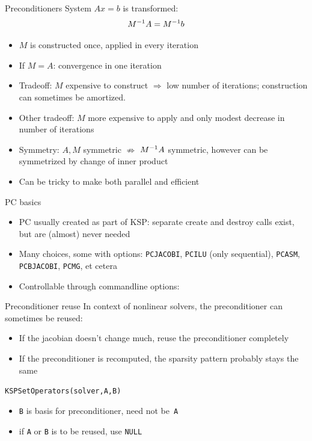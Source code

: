 \begin{longstory}
\begin{numberedframe}{Preconditioners}
System $Ax=b$ is transformed:
\[ M^{-1} A=M^{-1} b \]
\begin{itemize}
\item $M$ is constructed once, applied in every iteration
\item If $M=A$: convergence in one iteration
\item Tradeoff: $M$ expensive to construct $\Rightarrow$ low number of
  iterations; construction can sometimes be amortized.
\item Other tradeoff: $M$ more expensive to apply and only modest
  decrease in number of iterations
\item Symmetry: $A,M$ symmetric $\not\Rightarrow$ $M^{-1} A$ symmetric,
  however can be symmetrized by change of inner product
\item Can be tricky to make both parallel and efficient
\end{itemize}
\end{numberedframe}

\begin{numberedframe}{PC basics}
  \begin{itemize}
  \item PC usually created as part of KSP: separate create and destroy
    calls exist, but are (almost) never needed
  \item Many choices, some with options: \lstinline{PCJACOBI}, \lstinline{PCILU} (only
    sequential), \lstinline{PCASM}, \lstinline{PCBJACOBI}, \lstinline{PCMG}, et cetera
  \item Controllable through commandline options:\\
  \end{itemize}
\end{numberedframe}

\begin{numberedframe}{Preconditioner reuse}
In context of nonlinear solvers, the preconditioner can sometimes be reused:
\begin{itemize}
\item If the jacobian doesn't change much, reuse the preconditioner completely
\item If the preconditioner is recomputed, the sparsity pattern 
  probably stays the same
\end{itemize}
\lstinline{KSPSetOperators(solver,A,B)}
    \begin{itemize}
    \item \lstinline{B} is basis for preconditioner, need not be~\lstinline{A}
    \item if \lstinline{A} or \lstinline{B} is to be reused, use \lstinline{NULL}
    \end{itemize}
\end{numberedframe}


\end{longstory}
